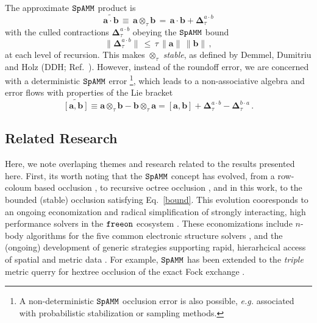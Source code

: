 \documentclass[letterpaper,twocolumn,amsmath,amsfont,amssymb,english,aps,jcp,preprintnumbers,groupaddress,nofootinbib,tightenlines,floatfix]{revtex4}
\newcommand{\mat}[1]{\boldsymbol{#1}}
\newcommand{\ot}{  {\scriptstyle \otimes}_{ \tau } }
\theoremstyle{plain}
\theoremstyle{remark}
\theoremstyle{plain}
\begin{document}
The approximate $\tt SpAMM$ product is
\begin{equation}
\widetilde{\mat{a}\cdot \mat{b}} \,  \equiv \, \mat{a} \ot \mat{b} \,
  = \, \mat{a} \cdot \mat{b} + \mat{\Delta}^{a \cdot b}_{\tau}
\end{equation}
with the culled contractions $\mat{\Delta}^{a \cdot b}_{\tau}$ obeying
the $\tt SpAMM$ bound
\begin{equation}\label{bound}
\lVert \mat{\Delta}^{a \cdot b}_{\tau} \rVert \, \leq \, \tau \, \lVert \mat{a} \rVert  \,  \lVert \mat{b} \rVert \, ,
\end{equation}
at each level of recursion.  This makes $\ot$ {\em stable}, as defined
by Demmel, Dumitriu and Holz (DDH; Ref.~\cite{Demmel07}).  However,
instead of the roundoff error, we are concerned with a deterministic
$\tt SpAMM$ error%
\footnote{A non-deterministic ${\tt SpAMM}$ occlusion error is also
  possible, {\em e.g.} associated with probabilistic stabilization
  \cite{} or sampling \cite{} methods.},
which leads to a non-associative algebra and error flows with
properties of the Lie bracket
\begin{equation} \label{braket}
\widetilde{\left[ \mat{a} , \mat{b} \right]} \equiv \mat{a} \ot \mat{b}-\mat{b} \ot \mat{a}
=  \left[ \mat{a} , \mat{b} \right]
+ \mat{\Delta}^{a\cdot b}_{\tau} -\mat{\Delta}^{b\cdot a}_{\tau} \,.
\end{equation}

\subsection{Related Research} 

Here, we note overlaping themes and research related to the results presented here.
First,  its worth noting that the $\tt SpAMM$ concept has evolved, 
from a row-coloum based occlusion \cite{}, to recursive octree occlusion \cite{}, and in this work, to the
bounded (stable) occlusion satisfying Eq.~\ref{bound}.    This evolution cooresponds to an  ongoing economization and radical simplification
of strongly interacting,  high performance solvers in the $\tt freeon$ ecosystem \cite{}.  These economizations 
include $n$-body algorithms for the five common electronic structure solvers \cite{}, 
and the (ongoing) development of generic strategies supporting rapid, hierarhcical access of spatial and metric data \cite{sammet, wise}.  
For example, $\tt SpAMM$ has been extended to the {\em triple} metric querry for hextree occlusion of 
the exact Fock exchange \cite{}.  
\end{document}
